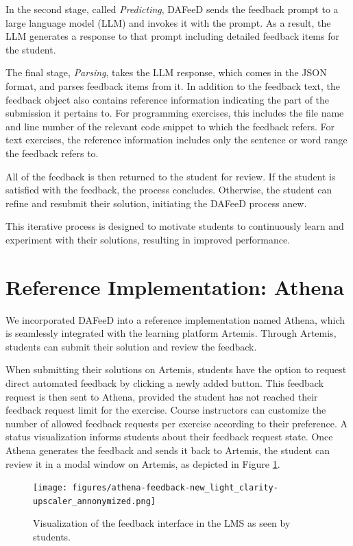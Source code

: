 \documentclass[manuscript,screen,review]{acmart}
\begin{document}
In the second stage, called \textit{Predicting}, DAFeeD sends the feedback prompt to a large language model (LLM) and invokes it with the prompt. 
As a result, the LLM generates a response to that prompt including detailed feedback items for the student.

The final stage, \textit{Parsing}, takes the LLM response, which comes in the JSON format, and parses feedback items from it. 
In addition to the feedback text, the feedback object also contains reference information indicating the part of the submission it pertains to.
For programming exercises, this includes the file name and line number of the relevant code snippet to which the feedback refers.
For text exercises, the reference information includes only the sentence or word range the feedback refers to.

All of the feedback is then returned to the student for review.
If the student is satisfied with the feedback, the process concludes. 
Otherwise, the student can refine and resubmit their solution, initiating the DAFeeD process anew.

This iterative process is designed to motivate students to continuously learn and experiment with their solutions, resulting in improved performance.


\section{Reference Implementation: Athena} %
\label{sec:reference-implementation}

We incorporated DAFeeD into a reference implementation named Athena, which is seamlessly integrated with the learning platform Artemis. 
Through Artemis, students can submit their solution and review the feedback.

When submitting their solutions on Artemis, students have the option to request direct automated feedback by clicking a newly added button.
This feedback request is then sent to Athena, provided the student has not reached their feedback request limit for the exercise.
Course instructors can customize the number of allowed feedback requests per exercise according to their preference.
A status visualization informs students about their feedback request state.
Once Athena generates the feedback and sends it back to Artemis, the student can review it in a modal window on Artemis, as depicted in Figure \ref{fig:Artemis-feedback-visualization}.


\begin{figure}[htbp]
  \centering
  \texttt{[image: figures/athena-feedback-new\_light\_clarity-upscaler\_annonymized.png]}
  \caption{Visualization of the feedback interface in the LMS as seen by students.}
  \label{fig:Artemis-feedback-visualization}
\end{figure}
\end{document}

